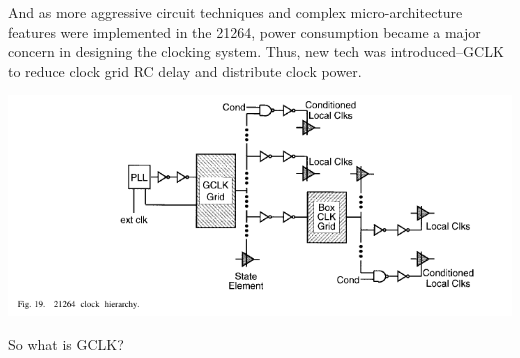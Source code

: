 \documentclass[11pt]{article}
\begin{document}
And as more aggressive circuit techniques and complex micro-architecture features were implemented in the 21264, power consumption became a major concern in designing the clocking system. Thus, new tech was introduced--GCLK to reduce clock grid RC delay and distribute clock power.
\begin{center}
	\includegraphics[scale=0.5]{GCLK.png}
\end{center}
So what is GCLK?
\end{document}
